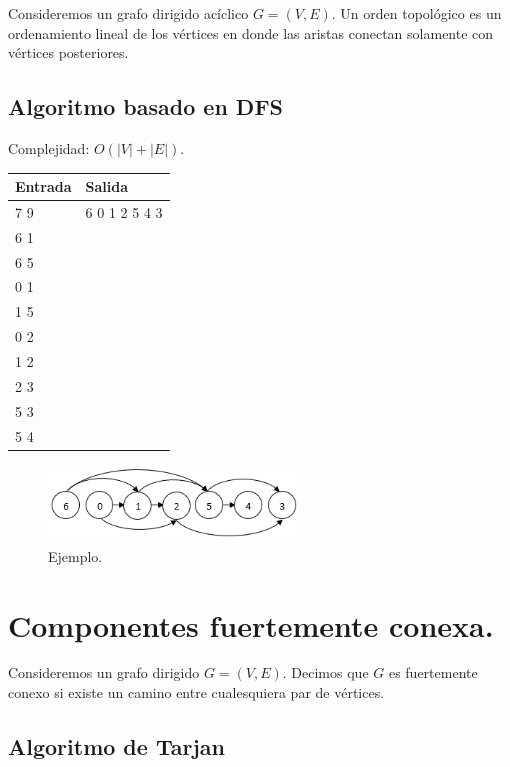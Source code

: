 \documentclass[12pt, letterpaper, twoside]{article}
\begin{document}
Consideremos un grafo dirigido acíclico $G = (V, E)$. Un orden topológico es un ordenamiento lineal de los vértices en donde las aristas conectan solamente con vértices posteriores.

\subsection{Algoritmo basado en DFS}

Complejidad: $O(|V| + |E|)$.

 \medskip

\begin{tabular}{|p{7cm}|p{7cm}|}
\hline
\textbf{Entrada} & \textbf{Salida}\\ \hline
7 9 & 6 0 1 2 5 4 3\\
6 1 & \\
6 5 & \\
0 1 & \\
1 5 & \\
0 2 & \\
1 2 & \\
2 3 & \\
5 3 & \\ 
5 4 & \\ \hline
\end{tabular}

\begin{figure}[h]
	\centering
	\includegraphics[width = 0.6\textwidth]{TopoSort.png}
	
	\caption{Ejemplo.}
\end{figure}

\newpage

\section{Componentes fuertemente conexa.}

Consideremos un grafo dirigido $G = (V, E)$. Decimos que $G$ es fuertemente conexo si existe un camino entre cualesquiera par de vértices.

\subsection{Algoritmo de Tarjan}
\end{document}
